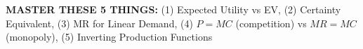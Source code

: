 \documentclass[8pt,landscape,letterpaper]{extarticle}
\begin{document}
\begin{center}
\begin{tcolorbox}[colback=yellow!20,colframe=orange!80,width=0.95\textwidth,arc=3mm,boxrule=1pt]
\centering
\textbf{MASTER THESE 5 THINGS:} (1) Expected Utility vs EV, (2) Certainty Equivalent, (3) MR for Linear Demand, (4) $P=MC$ (competition) vs $MR=MC$ (monopoly), (5) Inverting Production Functions
\end{tcolorbox}
\end{center}
\end{document}
